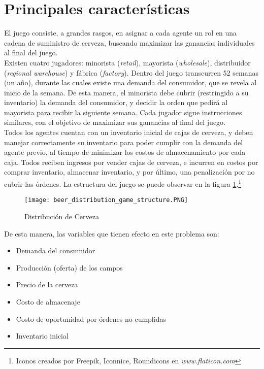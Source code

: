 \section{Principales caracter\'isticas}

El juego consiste, a grandes rasgos, en asignar a cada agente un rol en una cadena de suministro de cerveza, buscando maximizar las ganancias individuales al final del juego.\\

Existen cuatro jugadores: minorista (\textit{retail}), mayorista (\textit{wholesale}), distribuidor (\textit{regional warehouse}) y f\'abrica (\textit{factory}). Dentro del juego transcurren 52 semanas (un a\~no), durante las cuales existe una demanda del consumidor, que se revela al inicio de la semana. De esta manera, el minorista debe cubrir (restringido a su inventario) la demanda del consumidor, y decidir la orden que pedir\'a al mayorista para recibir la siguiente semana. Cada jugador sigue instrucciones similares, con el objetivo de maximizar sus ganancias al final del juego.\\

Todos los agentes cuentan con un inventario inicial de cajas de cerveza,  y deben manejar correctamente su inventario para poder cumplir con la demanda del agente previo, al tiempo de minimizar los costos de almacenamiento por cada caja. Todos reciben ingresos por vender cajas de cerveza, e incurren en costos por comprar inventario, almacenar inventario, y por \'ultimo, una penalizaci\'on por no cubrir las \'ordenes. La estructura del juego se puede observar en la figura \ref{structure}.\footnote{Iconos creados por Freepik, Iconnice, Roundicons en \textit{www.flaticon.com}}\\


\begin{figure}[ht]
\caption{Distribuci\'on de Cerveza}
\label{structure}
\texttt{[image: beer\_distribution\_game\_structure.PNG]}
\centering
\end{figure}

De esta manera, las variables que tienen efecto en este problema son:

\begin{itemize}
    \item Demanda del consumidor
    \item Producci\'on (oferta) de los campos
    \item Precio de la cerveza
    \item Costo de almacenaje
    \item Costo de oportunidad por \'ordenes no cumplidas
    \item Inventario inicial
\end{itemize}

